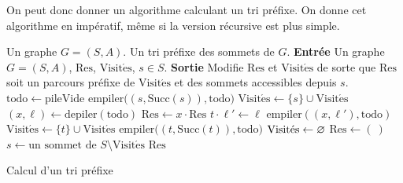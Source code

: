 On peut donc donner un algorithme calculant un tri préfixe. On donne cet algorithme en impératif, même si la version récursive est plus simple.

\begin{algorithm}[H]
	\centering
	\begin{algorithmic}[1]
		\Entree Un graphe $G = (S, A)$.
		\Sortie Un tri préfixe des sommets de $G$.
			\State \textbf{Entrée} Un graphe $G = (S,A)$, $\mathrm{Res}$, $\mathrm{Visit\acute es}$, $s \in S$.
			\State \textbf{Sortie} Modifie $\mathrm{Res}$\/ et $\mathrm{Visit\acute es}$\/ de sorte  que $\mathrm{Res}$\/ soit un parcours préfixe de $\mathrm{Visit\acute es}$\/ et des sommets accessibles depuis $s$.
			\State $\mathrm{todo} \gets \mathrm{pileVide}$\/
			\State $\mathrm{empiler}\big((s, \mathrm{Succ}(s)), \mathrm{todo}\big)$\/ 
			\State $\mathrm{Visit\acute es} \gets \{s\}  \cup \mathrm{Visit\acute es}$\/ 
				\State $(x, \ell) \gets \mathrm{depiler}(\mathrm{todo})$\/ 
				\If{$\ell = (\:)$}
					\State $\mathrm{Res} \gets x \cdot \mathrm{Res}$\/ 
				\Else
					\State $t \cdot \ell' \gets \ell$\/  
					\State $\mathrm{empiler}((x, \ell'), \mathrm{todo})$\/ 
						\State $\mathrm{Visit\acute es} \gets \{t\} \cup \mathrm{Visit\acute es}$\/ 
						\State $\mathrm{empiler}\big((t, \mathrm{Succ}(t)), \mathrm{todo}\big)$\/
					\EndIf
				\EndIf
			\EndWhile
		\EndProcedure \bigskip
		\State $\mathrm{Visit\acute es} \gets\varnothing$\/
		\State $\mathrm{Res} \gets (\:)$\/ 
			\State $s \gets \text{un sommet de } S \setminus \mathrm{Visit\acute es}$\/ 
			\State {}
		\EndWhile
		\State\Return $\mathrm{Res}$\/
	\end{algorithmic}
	\caption{Calcul d'un tri préfixe}
\end{algorithm}

